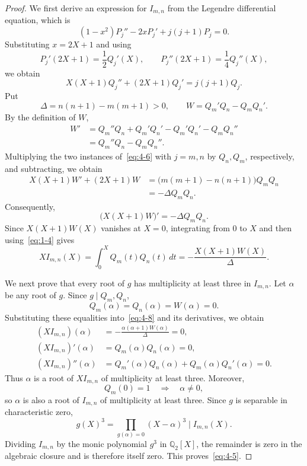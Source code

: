 \documentclass[11pt,a4paper]{article}
\numberwithin{equation}{section}
\theoremstyle{definition}
\begin{document}
\begin{proof}
We first derive an expression for $I_{m,n}$ from the Legendre differential equation, which is~\cite[Eq.~(14.2.1)]{DLMF}
\[
(1-x^2)P_j''-2xP_j'+j(j+1)P_j=0.
\]
Substituting $x=2X+1$ and using
\[
P_j'(2X+1)=\frac12Q_j'(X),\qquad
P_j''(2X+1)=\frac14Q_j''(X),
\]
we obtain
\begin{equation}\label{eq:4-6}
X(X+1)Q_j''+(2X+1)Q_j'=j(j+1)Q_j.
\end{equation}
Put
\[
\Delta=n(n+1)-m(m+1)>0,\qquad
W=Q_m'Q_n-Q_mQ_n'.
\]
By the definition of $W$,
\[
\begin{aligned}
W'&=Q_m''Q_n+Q_m'Q_n'-Q_m'Q_n'-Q_mQ_n''\\
&=Q_m''Q_n-Q_mQ_n''.
\end{aligned}
\]
Multiplying the two instances of~\eqref{eq:4-6} with $j=m,n$ by $Q_n,Q_m$, respectively, and subtracting, we obtain
\[
\begin{aligned}
X(X+1)W'+(2X+1)W
&=\bigl(m(m+1)-n(n+1)\bigr)Q_mQ_n\\
&=-\Delta Q_mQ_n.
\end{aligned}
\]
Consequently,
\begin{equation}\label{eq:4-7}
\bigl(X(X+1)W\bigr)'=-\Delta Q_mQ_n.
\end{equation}
Since $X(X+1)W(X)$ vanishes at $X=0$, integrating from $0$ to $X$ and then using~\eqref{eq:1-4} gives
\begin{equation}\label{eq:4-8}
XI_{m,n}(X)=\int_0^X Q_m(t)Q_n(t)\,dt
=-\frac{X(X+1)W(X)}{\Delta}.
\end{equation}

We next prove that every root of $g$ has multiplicity at least three in $I_{m,n}$. Let $\alpha$ be any root of $g$. Since $g\mid Q_m,Q_n$,
\[
Q_m(\alpha)=Q_n(\alpha)=W(\alpha)=0.
\]
Substituting these equalities into~\eqref{eq:4-8} and its derivatives, we obtain
\[
\begin{aligned}
(XI_{m,n})(\alpha)
&=-\frac{\alpha(\alpha+1)W(\alpha)}{\Delta}=0,\\
(XI_{m,n})'(\alpha)
&=Q_m(\alpha)Q_n(\alpha)=0,\\
(XI_{m,n})''(\alpha)
&=Q_m'(\alpha)Q_n(\alpha)+Q_m(\alpha)Q_n'(\alpha)=0.
\end{aligned}
\]
Thus $\alpha$ is a root of $XI_{m,n}$ of multiplicity at least three. Moreover,
\[
Q_m(0)=1\quad\Longrightarrow\quad\alpha\ne0,
\]
so $\alpha$ is also a root of $I_{m,n}$ of multiplicity at least three. Since $g$ is separable in characteristic zero,
\[
g(X)^3=\prod_{g(\alpha)=0}(X-\alpha)^3\mid I_{m,n}(X).
\]
Dividing $I_{m,n}$ by the monic polynomial $g^3$ in $\mathbb{Q}_2[X]$, the remainder is zero in the algebraic closure and is therefore itself zero. This proves~\eqref{eq:4-5}.
\end{proof}
\end{document}
